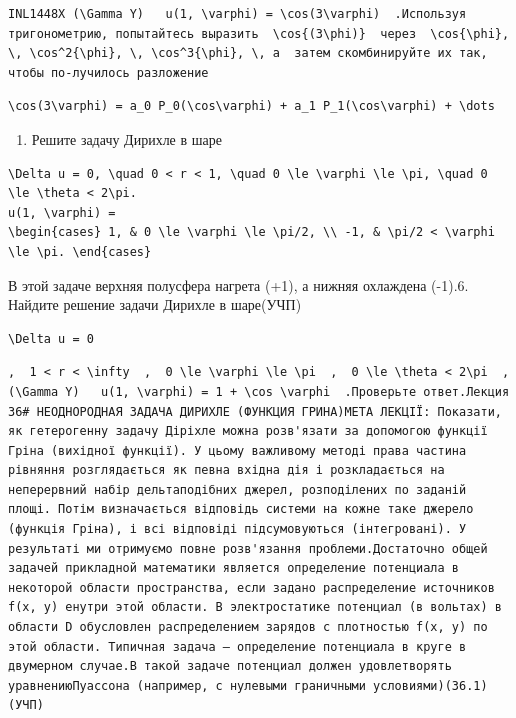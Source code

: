 \documentclass[
  ukrainian,
]{article}
\providecommand{\tightlist}{%
  \setlength{\itemsep}{0pt}\setlength{\parskip}{0pt}}
\begin{document}
\begin{verbatim}
INL1448X (\Gamma Y)   u(1, \varphi) = \cos(3\varphi)  .Используя тригонометрию, попытайтесь выразить  \cos{(3\phi)}  через  \cos{\phi}, \, \cos^2{\phi}, \, \cos^3{\phi}, \, a  затем скомбинируйте их так, чтобы по-лучилось разложение
\end{verbatim}

\begin{verbatim}
\cos(3\varphi) = a_0 P_0(\cos\varphi) + a_1 P_1(\cos\varphi) + \dots
\end{verbatim}

\begin{enumerate}
\def\labelenumi{\arabic{enumi}.}
\setcounter{enumi}{4}
\tightlist
\item
  Решите задачу Дирихле в шаре
\end{enumerate}

\begin{verbatim}
\Delta u = 0, \quad 0 < r < 1, \quad 0 \le \varphi \le \pi, \quad 0 \le \theta < 2\pi.
u(1, \varphi) =
\begin{cases} 1, & 0 \le \varphi \le \pi/2, \\ -1, & \pi/2 < \varphi \le \pi. \end{cases}
\end{verbatim}

В этой задаче верхняя полусфера нагрета (+1), а нижняя охлаждена (-1).6.
Найдите решение задачи Дирихле в шаре(УЧП)

\begin{verbatim}
\Delta u = 0
\end{verbatim}

\begin{verbatim}
,  1 < r < \infty  ,  0 \le \varphi \le \pi  ,  0 \le \theta < 2\pi  ,  (\Gamma Y)   u(1, \varphi) = 1 + \cos \varphi  .Проверьте ответ.Лекция 36# НЕОДНОРОДНАЯ ЗАДАЧА ДИРИХЛЕ (ФУНКЦИЯ ГРИНА)МЕТА ЛЕКЦІЇ: Показати, як гетерогенну задачу Діріхле можна розв'язати за допомогою функції Гріна (вихідної функції). У цьому важливому методі права частина рівняння розглядається як певна вхідна дія і розкладається на неперервний набір дельтаподібних джерел, розподілених по заданій площі. Потім визначається відповідь системи на кожне таке джерело (функція Гріна), і всі відповіді підсумовуються (інтегровані). У результаті ми отримуємо повне розв'язання проблеми.Достаточно общей задачей прикладной математики является определение потенциала в некоторой области пространства, если задано распределение источников f(x, y) енутри этой области. В электростатике потенциал (в вольтах) в области D обусловлен распределением зарядов с плотностью f(x, y) по этой области. Типичная задача — определение потенциала в круге в двумерном случае.В такой задаче потенциал должен удовлетворять уравнениюПуассона (например, с нулевыми граничными условиями)(36.1) (УЧП)
\end{verbatim}
\end{document}
